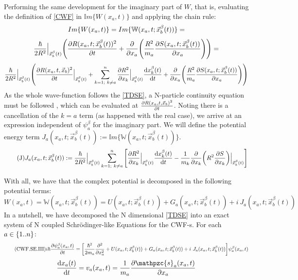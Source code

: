 \documentclass[11pt, a4paper]{article} %
\newcommand{\z}{\mathpzc{s}}
\newcommand{\W}{\mathbb{W}}
\begin{document}
Performing the same development for the imaginary part of $W$, that is, evaluating the definition of \ref{CWF} in $\mathbb{I}m\{W(x_a,t)\}$ and applying the chain rule:
$$
Im\{W(x_a,t)\}=Im\{\W(x_a,t; \vec{x}_b^\beta(t))\}=\vspace{-0.1cm}
$$
$$
\frac{\hbar}{2R^2}\Big\rvert_{\vec{x}_b^\beta(t)} \qty( \pdv{R(x_a,t;\vec{x}_b^\beta(t))^2}{t} + \pdv{}{x_a} \qty(\frac{R^2}{m_a} \pdv{S(x_a,t; \vec{x}_b^\beta(t))}{x_a} ))=\vspace{-0.1cm}
$$
$$
\frac{\hbar}{2R^2}\Big\rvert_{\vec{x}_b^\beta(t)} \qty( \pdv{R(x_a,t, \vec{x}_b)^2}{t}\Big\rvert_{\vec{x}_b^\beta(t)} + \sum_{k=1;\ k \neq a}^n \pdv{R^2}{x_k}\Big\rvert_{\vec{x}_b^\beta(t)} \dv{x_k^\beta(t)}{t} + \pdv{}{x_a} \qty(\frac{R^2}{m_a} \pdv{S(x_a,t; \vec{x}_b^\beta(t))}{x_a} ) )
$$
As the whole wave-function follows the \ref{TDSE}, a N-particle continuity equation must be followed \cite{nireTFGie}, which can be evaluated at $\pdv{R(x_a,t, \vec{x}_b)^2}{t}$. Noting there is a cancellation of the $k=a$ term (as happened with the real case), we arrive at an expression independent of $\psi_a^\beta$ for the imaginary part. We will define the potential energy term $J_a(x_a,t; \vec{x}_b^\beta(t)):=\mathbb{I}m\{\W(x_a,t; \vec{x}_b^\beta(t))\}$.
\begin{equation}\label{J}\tag{J}
J_a(x_a,t; \vec{x}_b^\beta(t)):= \frac{\hbar}{2R^2}\Big\rvert_{\vec{x}_b^\beta(t)} \sum_{k=1;\ k \neq a}^n \qty[ \pdv{R^2}{x_k}\Big\rvert_{\vec{x}_b^\beta(t)} \dv{x_k^\beta(t)}{t} - \frac{1}{m_k} \pdv{}{x_k} \qty(R^2 \pdv{S}{x_k} )\Big\rvert_{\vec{x}_b^\beta(t)} ]
\end{equation}

With all, we have that the complex potential is decomposed in the following potential terms:
$$
W(x_a,t)=\W(x_a,t; \vec{x}_b^\beta(t))= U(x_a,t; \vec{x}_b^\beta(t)) + G_a(x_a,t; \vec{x}_b^\beta(t))+i\ J_a(x_a,t; \vec{x}_b^\beta(t))
$$
In a nutshell, we have decomposed the N dimensional \ref{TDSE} into an exact system of N coupled Schrödinger-like Equations for the CWF-s. For each $a \in \qty{1..n}$:
\begin{equation}\label{CWF.SE.III}\tag{CWF.SE.III}
i \hbar \pdv{\psi_a^\beta(x_a,t)}{t} = \qty[\frac{\hbar^2}{2m_a} \pdv[2]{}{x_a} +  U(x_a,t; \vec{x}_b^\beta(t)) + G_a(x_a,t; \vec{x}_b^\beta(t))+i\ J_a(x_a,t; \vec{x}_b^\beta(t))] \psi_a^\beta(x_a,t)
\end{equation}
\begin{equation*}
\begin{split}
\dv{x_a(t)}{t}=v_a(x_a,t)=\frac{1}{m_a}\pdv{\z_a(x_a, t)}{x_a}
\end{split}
\end{equation*}
\end{document}
